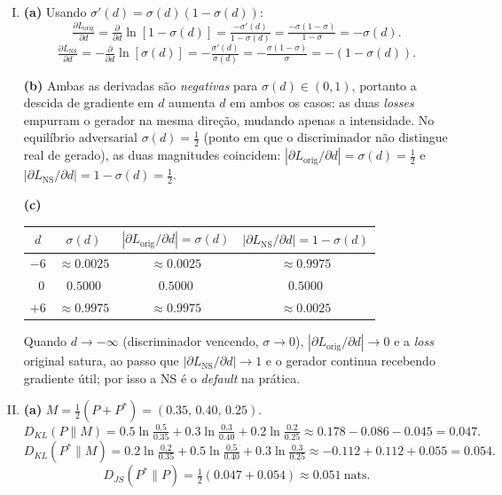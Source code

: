 \documentclass{dlproblemset}
\begin{document}
\begin{enumerate}[I)]
    \item \textbf{(a)} Usando $\sigma'(d) = \sigma(d)(1 - \sigma(d))$:
    \[
      \tfrac{\partial L_{\text{orig}}}{\partial d}
      = \tfrac{\partial}{\partial d}\ln[1 - \sigma(d)]
      = \tfrac{-\sigma'(d)}{1 - \sigma(d)}
      = \tfrac{-\sigma(1 - \sigma)}{1 - \sigma}
      = -\sigma(d).
    \]
    \[
      \tfrac{\partial L_{\text{NS}}}{\partial d}
      = -\tfrac{\partial}{\partial d}\ln[\sigma(d)]
      = -\tfrac{\sigma'(d)}{\sigma(d)}
      = -\tfrac{\sigma(1 - \sigma)}{\sigma}
      = -(1 - \sigma(d)).
    \]

    \textbf{(b)} Ambas as derivadas são \emph{negativas} para $\sigma(d) \in (0, 1)$, portanto a descida de gradiente em $d$ aumenta $d$ em ambos os casos: as duas \emph{losses} empurram o gerador na mesma direção, mudando apenas a intensidade. No equilíbrio adversarial $\sigma(d) = \tfrac{1}{2}$ (ponto em que o discriminador não distingue real de gerado), as duas magnitudes coincidem: $|\partial L_{\text{orig}}/\partial d| = \sigma(d) = \tfrac{1}{2}$ e $|\partial L_{\text{NS}}/\partial d| = 1 - \sigma(d) = \tfrac{1}{2}$.

    \textbf{(c)}
    \begin{center}
    \begin{tabular}{cccc}
      \toprule
      $d$ & $\sigma(d)$ & $|\partial L_{\text{orig}}/\partial d| = \sigma(d)$ & $|\partial L_{\text{NS}}/\partial d| = 1 - \sigma(d)$ \\
      \midrule
      $-6$ & $\approx 0.0025$ & $\approx 0.0025$ & $\approx 0.9975$ \\
      $\;\;0$ & $0.5000$ & $0.5000$ & $0.5000$ \\
      $+6$ & $\approx 0.9975$ & $\approx 0.9975$ & $\approx 0.0025$ \\
      \bottomrule
    \end{tabular}
    \end{center}
    Quando $d \to -\infty$ (discriminador vencendo, $\sigma \to 0$), $|\partial L_{\text{orig}}/\partial d| \to 0$ e a \emph{loss} original satura, ao passo que $|\partial L_{\text{NS}}/\partial d| \to 1$ e o gerador continua recebendo gradiente útil; por isso a NS é o \emph{default} na prática.

    \item \textbf{(a)} $M = \tfrac{1}{2}(P + P^{*}) = (0.35,\, 0.40,\, 0.25)$.
    \[
      D_{KL}(P\|M) = 0.5\ln\tfrac{0.5}{0.35} + 0.3\ln\tfrac{0.3}{0.40} + 0.2\ln\tfrac{0.2}{0.25}
                   \approx 0.178 - 0.086 - 0.045 = 0.047.
    \]
    \[
      D_{KL}(P^{*}\|M) = 0.2\ln\tfrac{0.2}{0.35} + 0.5\ln\tfrac{0.5}{0.40} + 0.3\ln\tfrac{0.3}{0.25}
                       \approx -0.112 + 0.112 + 0.055 = 0.054.
    \]
    \[
      D_{JS}(P^{*}\|P) = \tfrac{1}{2}(0.047 + 0.054) \approx 0.051\ \text{nats}.
    \]


\end{enumerate}
\end{document}
